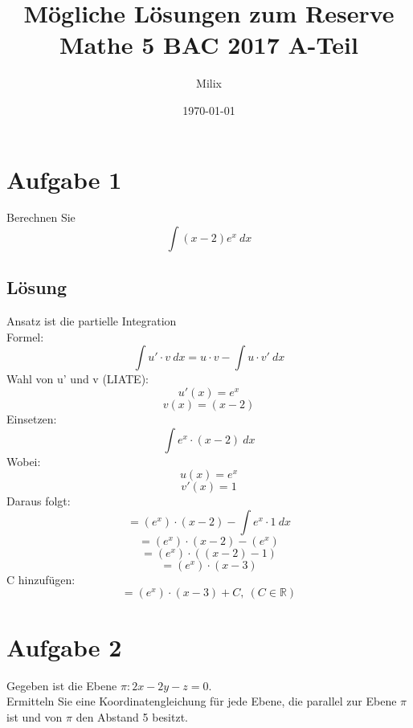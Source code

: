 \documentclass{article}
\title{Mögliche Lösungen zum Reserve Mathe 5 BAC 2017 A-Teil}
\author{Milix}
\date{\today}
\begin{document}
\maketitle

\section*{Aufgabe 1}
Berechnen Sie
\[\int(x-2)e^x\ dx\]

\subsection*{Lösung}
Ansatz ist die partielle Integration \\
Formel:
\[\int u'\cdot v\ dx=u\cdot v-\int u\cdot v'\ dx\]
Wahl von u' und v (LIATE):
\[u'(x)=e^x\]
\[v(x)=(x-2)\]
Einsetzen:
\[\int e^x\cdot (x-2)\ dx\]
Wobei:
\[u(x)=e^x\]
\[v'(x)=1\]
Daraus folgt:
\[=(e^x)\cdot (x-2)-\int e^x\cdot 1\ dx\]
\[=(e^x)\cdot (x-2)-(e^x)\]
\[=(e^x)\cdot ((x-2)-1)\]
\[=(e^x)\cdot (x-3)\]
C hinzufügen:
\[=(e^x)\cdot (x-3)+C,\ (C\in\mathbb{R})\]

\newpage
\section*{Aufgabe 2}
Gegeben ist die Ebene \(\pi :2x-2y-z=0\). \\
Ermitteln Sie eine Koordinatengleichung für jede Ebene, die parallel zur
Ebene \(\pi\) ist und von \(\pi\) den Abstand 5 besitzt.
\end{document}
